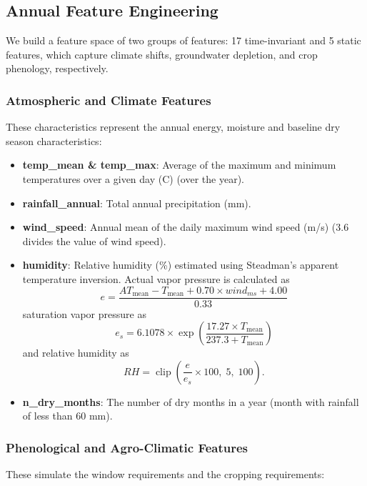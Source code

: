 \documentclass{ieeeaccess}
\begin{document}
\subsection{Annual Feature Engineering}

We build a feature space of two groups of features: 17 time-invariant and 5 static features, which capture climate shifts, groundwater depletion, and crop phenology, respectively.

\subsubsection{Atmospheric and Climate Features}

These characteristics represent the annual energy, moisture and baseline dry season characteristics:

\begin{itemize}
    \item \textbf{temp\_mean \& temp\_max}: Average of the maximum and minimum temperatures over a given day (C) (over the year).

    \item \textbf{rainfall\_annual}: Total annual precipitation (mm).

    \item \textbf{wind\_speed}: Annual mean of the daily maximum wind speed (m/s) (3.6 divides the value of wind speed).

    \item \textbf{humidity}: Relative humidity (\%) estimated using Steadman's apparent temperature inversion. Actual vapor pressure is calculated as
    \[
    e = \frac{AT_{\text{mean}} - T_{\text{mean}} + 0.70 \times wind_{ms} + 4.00}{0.33}
    \]
    saturation vapor pressure as
    \[
    e_s = 6.1078 \times \exp\left(\frac{17.27 \times T_{\text{mean}}}{237.3 + T_{\text{mean}}}\right)
    \]
    and relative humidity as
    \[
    RH = \operatorname{clip}\left(\frac{e}{e_s} \times 100,\;5,\;100\right).
    \]

    \item \textbf{n\_dry\_months}: The number of dry months in a year (month with rainfall of less than 60 mm).
\end{itemize}

\subsubsection{Phenological and Agro-Climatic Features}

These simulate the window requirements and the cropping requirements:
\end{document}
